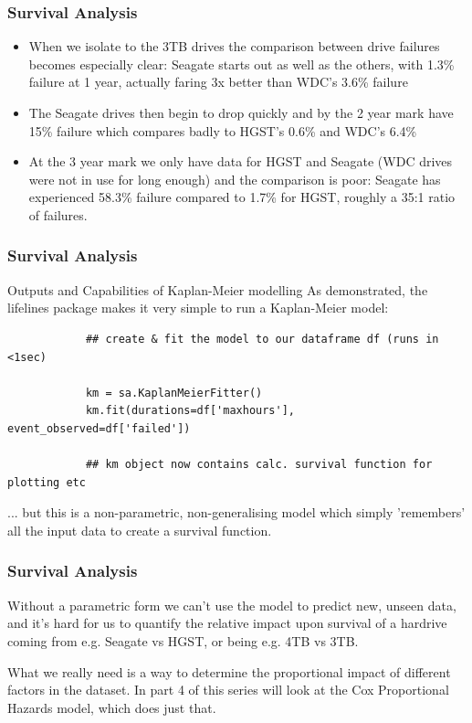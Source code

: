 \documentclass[]{beamer}
\begin{document}
	\begin{frame}
		\frametitle{Survival Analysis}
		\large
		\begin{itemize}
			\item When we isolate to the 3TB drives the comparison between drive failures becomes especially clear:
			Seagate starts out as well as the others, with 1.3\% failure at 1 year, actually faring 3x better than WDC's 3.6\% failure
			\item The Seagate drives then begin to drop quickly and by the 2 year mark have 15\% failure which compares badly to HGST's 0.6\% and WDC's 6.4\%
			\item At the 3 year mark we only have data for HGST and Seagate (WDC drives were not in use for long enough) and the comparison is poor: Seagate has experienced 58.3\% failure compared to 1.7\% for HGST, roughly a 35:1 ratio of failures.
		\end{itemize}
		
		
	\end{frame}
	\begin{frame}[fragile]
		\frametitle{Survival Analysis}
		
		Outputs and Capabilities of Kaplan-Meier modelling
		As demonstrated, the lifelines package makes it very simple to run a Kaplan-Meier model:
		
		\begin{framed}
			\begin{verbatim}
			## create & fit the model to our dataframe df (runs in <1sec)
			
			km = sa.KaplanMeierFitter()  
			km.fit(durations=df['maxhours'], event_observed=df['failed'])
			
			## km object now contains calc. survival function for plotting etc
			\end{verbatim}
		\end{framed}
		... but this is a non-parametric, non-generalising model which simply 'remembers' all the input data to create a survival function. 
	\end{frame}
	\begin{frame}[fragile]
		\frametitle{Survival Analysis}Without a parametric form we can't use the model to predict new, unseen data, and it's hard for us to quantify the relative impact upon survival of a hardrive coming from e.g. Seagate vs HGST, or being e.g. 4TB vs 3TB.
		
		
		What we really need is a way to determine the proportional impact of different factors in the dataset. In part 4 of this series will look at the Cox Proportional Hazards model, which does just that.
		
	\end{frame}
\end{document}
